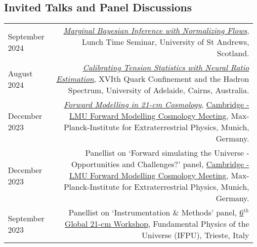 \documentclass{article}
\begin{document}
\subsection*{Invited Talks and Panel Discussions}
\begin{tabular}{L!{\vrule}R}
September 2024 & \href{https://github.com/htjb/Talks/raw/master/Talks/St-Andrews-Seminar-Sept-2024/standrews24.pdf}{\textit{Marginal Bayesian Inference with Normalizing Flows}}, Lunch Time Seminar, University of St Andrews, Scotland. \\ 
August 2024 & \href{https://indico.cern.ch/event/1293041/contributions/5970077/}{\textit{Calibrating Tension Statistics with Neural Ratio Estimation}}, XVIth Quark Confinement and the Hadron Spectrum, University of Adelaide, Cairns, Australia. \\
December 2023 & \href{https://github.com/htjb/Talks/raw/master/Talks/cambridge-lmu/Cambridge-LMU.pdf}{\textit{Forward Modelling in 21-cm Cosmology}}, \href{https://indico.physik.uni-muenchen.de/event/394/}{Cambridge - LMU Forward Modelling Cosmology Meeting}, Max-Planck-Institute for Extraterrestrial Physics, Munich, Germany.\\
December 2023 & Panellist on `Forward simulating the Universe - Opportunities and Challenges?' panel, \href{https://indico.physik.uni-muenchen.de/event/394/}{Cambridge - LMU Forward Modelling Cosmology Meeting}, Max-Planck-Institute for Extraterrestrial Physics, Munich, Germany. \\
September 2023 & Panellist on `Instrumentation \& Methods' panel, \href{https://global21cmworkshop.org/2023-ifpu/}{6$^{th}$ Global 21-cm Workshop}, Fundamental Physics of the Universe (IFPU), Trieste, Italy \\
\end{tabular}
\end{document}
